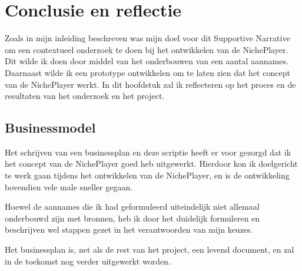 \section{Conclusie en reflectie}

Zoals in mijn inleiding beschreven was mijn doel voor dit Supportive Narrative om een contextueel onderzoek te doen bij het ontwikkelen van de NichePlayer. Dit wilde ik doen door middel van het onderbouwen van een aantal aannames. Daarnaast wilde ik een prototype ontwikkelen om te laten zien dat het concept van de NichePlayer werkt. In dit hoofdstuk zal ik reflecteren op het proces en de resultaten van het onderzoek en het project.

\subsection{Businessmodel}
Het schrijven van een businessplan en deze scriptie heeft er voor gezorgd dat ik het concept van de NichePlayer goed heb uitgewerkt. Hierdoor kon ik doelgericht te werk gaan tijdens het ontwikkelen van de NichePlayer, en is de ontwikkeling bovendien vele male sneller gegaan.

Hoewel de aannames die ik had geformuleerd uiteindelijk niet allemaal onderbouwd zijn met bronnen, heb ik door het duidelijk formuleren en beschrijven wel stappen gezet in het verantwoorden van mijn keuzes.

Het businessplan is, net als de rest van het project, een levend document, en zal in de toekomst nog verder uitgewerkt worden.

